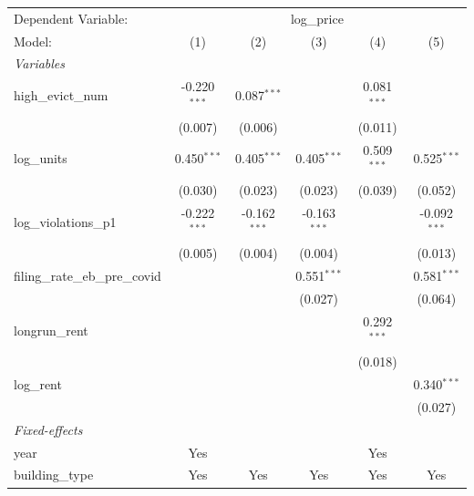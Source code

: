 \begingroup
\centering
\begin{tabular}{lccccc}
   \tabularnewline \midrule \midrule
   Dependent Variable: & \multicolumn{5}{c}{log\_price}\\
   Model:                           & (1)            & (2)            & (3)            & (4)           & (5)\\  
   \midrule
   \emph{Variables}\\
   high\_evict\_num                 & -0.220$^{***}$ & 0.087$^{***}$  &                & 0.081$^{***}$ &   \\   
                                    & (0.007)        & (0.006)        &                & (0.011)       &   \\   
   log\_units                       & 0.450$^{***}$  & 0.405$^{***}$  & 0.405$^{***}$  & 0.509$^{***}$ & 0.525$^{***}$\\   
                                    & (0.030)        & (0.023)        & (0.023)        & (0.039)       & (0.052)\\   
   log\_violations\_p1              & -0.222$^{***}$ & -0.162$^{***}$ & -0.163$^{***}$ &               & -0.092$^{***}$\\   
                                    & (0.005)        & (0.004)        & (0.004)        &               & (0.013)\\   
   filing\_rate\_eb\_pre\_covid     &                &                & 0.551$^{***}$  &               & 0.581$^{***}$\\   
                                    &                &                & (0.027)        &               & (0.064)\\   
   longrun\_rent                    &                &                &                & 0.292$^{***}$ &   \\   
                                    &                &                &                & (0.018)       &   \\   
   log\_rent                        &                &                &                &               & 0.340$^{***}$\\   
                                    &                &                &                &               & (0.027)\\   
   \midrule
   \emph{Fixed-effects}\\
   year                             & Yes            &                &                & Yes           & \\  
   building\_type                   & Yes            & Yes            & Yes            & Yes           & Yes\\  

\end{tabular}
